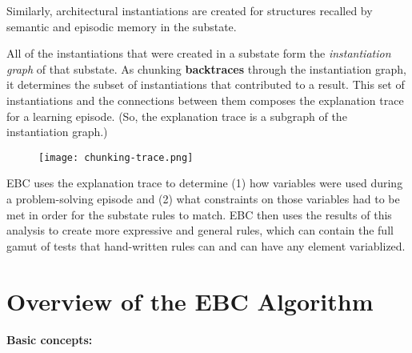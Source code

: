 Similarly, architectural instantiations are created for structures recalled by semantic and episodic memory in the substate. 

All of the instantiations that were created in a substate form the \textit{instantiation graph} of that substate.  As chunking \textbf{backtraces} through the instantiation graph, it determines the subset of instantiations that contributed to a result.  This set of instantiations and the connections between them composes the explanation trace for a learning episode.  (So, the explanation trace is a subgraph of the instantiation graph.)

\begin{figure}[!h]
	\centering
	\texttt{[image: chunking-trace.png]}
	\label{fig:chunking-trace}
\end{figure}

EBC uses the explanation trace to determine (1) how variables were used during a problem-solving episode and (2) what constraints on those variables had to be met in order for the substate rules to match.  EBC then uses the results of this analysis to create more expressive and general rules, which can contain the full gamut of tests that hand-written rules can and can have any element variablized.


\section{Overview of the EBC Algorithm}
\label{CHUNKING-ebc}

\textbf{Basic concepts:}

